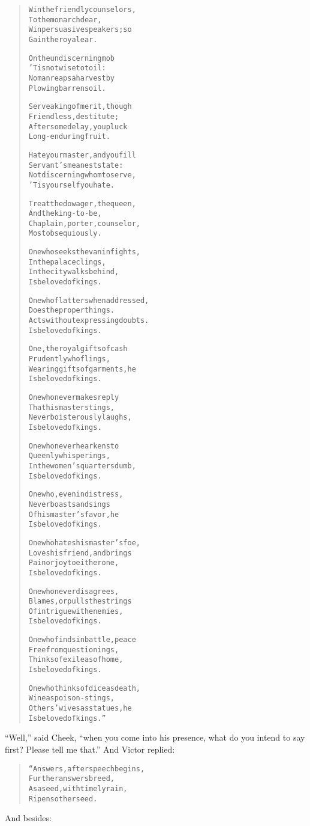 \documentclass[article, twoside, 14pt]{memoir}
\renewenvironment{verbatim}{%
\begin{quote}%
\vskip -10pt%
\begin{alltt}\normalfont\large}{\end{alltt}%
\end{quote}%
\vskip -10pt
} %
\begin{document}
\begin{verbatim}
Win the friendly counselors,
    To the monarch dear,
Win persuasive speakers; so
    Gain the royal ear.

On the undiscerning mob
    'Tis not wise to toil:
No man reaps a harvest by
    Plowing barren soil.

Serve a king of merit, though
    Friendless, destitute;
After some delay, you pluck
    Long-enduring fruit.

Hate your master, and you fill
    Servant's meanest state:
Not discerning whom to serve,
    'Tis yourself you hate.

Treat the dowager, the queen,
    And the king-to-be,
Chaplain, porter, counselor,
    Most obsequiously.

One who seeks the van in fights,
    In the palace clings,
In the city walks behind,
    Is beloved of kings.

One who flatters when addressed,
    Does the proper things.
Acts without expressing doubts.
    Is beloved of kings.

One, the royal gifts of cash
    Prudently who flings,
Wearing gifts of garments, he
    Is beloved of kings.

One who never makes reply
    That his master stings,
Never boisterously laughs,
    Is beloved of kings.

One who never hearkens to
    Queenly whisperings,
In the women's quarters dumb,
    Is beloved of kings.

One who, even in distress,
    Never boasts and sings
Of his master's favor, he
    Is beloved of kings.

One who hates his master's foe,
    Loves his friend, and brings
Pain or joy to either one,
    Is beloved of kings.

One who never disagrees,
    Blames, or pulls the strings
Of intrigue with enemies,
    Is beloved of kings.

One who finds in battle, peace
    Free from questionings,
Thinks of exile as of home,
    Is beloved of kings.

One who thinks of dice as death,
    Wine as poison-stings,
Others' wives as statues, he
    Is beloved of kings.”
\end{verbatim}
``Well,'' said Cheek,
``when you come into his presence, what do you intend to say first? Please tell me that.''
And Victor replied:

\begin{verbatim}
“Answers, after speech begins,
    Further answers breed,
As a seed, with timely rain,
    Ripens other seed.
\end{verbatim}
And besides:
\end{document}
